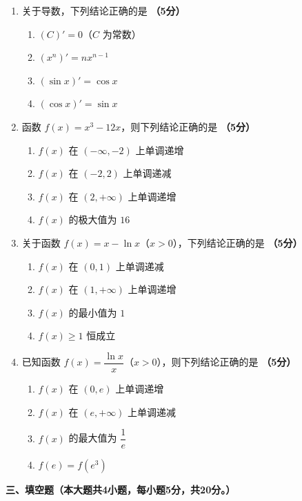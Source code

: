 \documentclass[12pt, a4paper]{ctexart}
\newcommand{\score}[1]{\hfill\textbf{（#1分）}}
\begin{document}
\begin{enumerate}[resume]
\item 关于导数，下列结论正确的是 \score{5}
\begin{enumerate}[label=\Alph*.]
\item $(C)'=0$（$C$ 为常数）
\item $(x^n)'=nx^{n-1}$
\item $(\sin x)'=\cos x$
\item $(\cos x)'=\sin x$
\end{enumerate}

\item 函数 $f(x)=x^3-12x$，则下列结论正确的是 \score{5}
\begin{enumerate}[label=\Alph*.]
\item $f(x)$ 在 $(-\infty,-2)$ 上单调递增
\item $f(x)$ 在 $(-2,2)$ 上单调递减
\item $f(x)$ 在 $(2,+\infty)$ 上单调递增
\item $f(x)$ 的极大值为 $16$
\end{enumerate}

\item 关于函数 $f(x)=x-\ln x$（$x>0$），下列结论正确的是 \score{5}
\begin{enumerate}[label=\Alph*.]
\item $f(x)$ 在 $(0,1)$ 上单调递减
\item $f(x)$ 在 $(1,+\infty)$ 上单调递增
\item $f(x)$ 的最小值为 $1$
\item $f(x)\geq 1$ 恒成立
\end{enumerate}

\item 已知函数 $f(x)=\dfrac{\ln x}{x}$（$x>0$），则下列结论正确的是 \score{5}
\begin{enumerate}[label=\Alph*.]
\item $f(x)$ 在 $(0,e)$ 上单调递增
\item $f(x)$ 在 $(e,+\infty)$ 上单调递减
\item $f(x)$ 的最大值为 $\dfrac{1}{e}$
\item $f(e)=f(e^3)$
\end{enumerate}
\end{enumerate}

\vspace{1em}

\noindent\textbf{三、填空题（本大题共4小题，每小题5分，共20分。）}

\vspace{0.5em}
\end{document}
